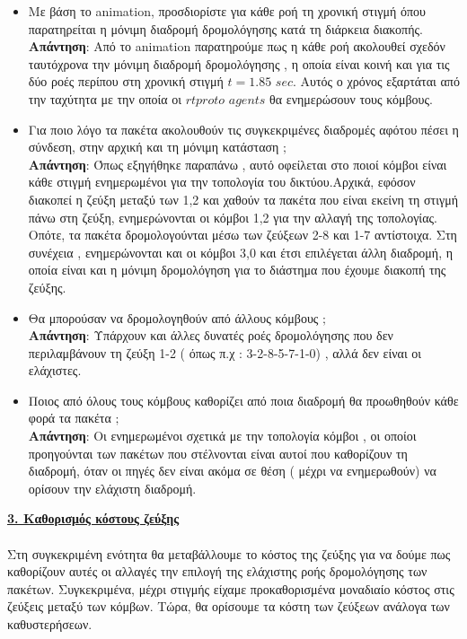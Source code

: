 \documentclass{article}%
\begin{document}
\begin{itemize}
\begin{figure}[htbp]
\begin{minipage}{0.35\textwidth}
\end{minipage}
\end{figure}
	\item Με βάση το \textlatin{animation}, προσδιορίστε για κάθε ροή τη χρονική στιγμή όπου παρατηρείται
η μόνιμη διαδρομή δρομολόγησης κατά τη διάρκεια διακοπής.\\
	\textbf{Απάντηση}: Από το \textlatin{animation} παρατηρούμε πως η κάθε ροή ακολουθεί σχεδόν ταυτόχρονα την μόνιμη διαδρομή δρομολόγησης , η οποία είναι κοινή και για τις δύο ροές περίπου στη χρονική στιγμή $t=1.85$ $sec$. Αυτός ο χρόνος εξαρτάται από την ταχύτητα με την οποία οι $rtproto$ $agents$ θα ενημερώσουν τους κόμβους.
	\item Για ποιο λόγο τα πακέτα ακολουθούν τις συγκεκριμένες διαδρομές αφότου πέσει η
σύνδεση, στην αρχική και τη μόνιμη κατάσταση $;$ \\
	\textbf{Απάντηση}: Όπως εξηγήθηκε παραπάνω , αυτό οφείλεται στο ποιοί κόμβοι είναι κάθε στιγμή ενημερωμένοι για την τοπολογία του δικτύου.Αρχικά, εφόσον διακοπεί η ζεύξη μεταξύ των 1,2 και χαθούν τα πακέτα που είναι εκείνη τη στιγμή πάνω στη ζεύξη, ενημερώνονται οι κόμβοι 1,2 για την αλλαγή της τοπολογίας. Οπότε, τα πακέτα δρομολογούνται μέσω των ζεύξεων 2-8 και 1-7 αντίστοιχα. Στη συνέχεια , ενημερώνονται και οι κόμβοι 3,0 και έτσι επιλέγεται άλλη διαδρομή, η οποία είναι και η μόνιμη δρομολόγηση για το διάστημα που έχουμε διακοπή της ζεύξης.
	\item Θα μπορούσαν να δρομολογηθούν από άλλους κόμβους $;$\\
	\textbf{Απάντηση}: Υπάρχουν και άλλες δυνατές ροές δρομολόγησης που δεν περιλαμβάνουν τη ζεύξη 1-2 ( όπως π.χ : 3-2-8-5-7-1-0) , αλλά δεν είναι οι ελάχιστες.
	\item Ποιος από όλους τους κόμβους καθορίζει από ποια διαδρομή θα προωθηθούν κάθε φορά
τα πακέτα $; $\\ 
	\textbf{Απάντηση}: Οι ενημερωμένοι σχετικά με την τοπολογία κόμβοι , οι οποίοι προηγούνται των πακέτων που στέλνονται είναι αυτοί που καθορίζουν τη διαδρομή, όταν οι πηγές δεν είναι ακόμα σε θέση ( μέχρι να ενημερωθούν) να ορίσουν την ελάχιστη διαδρομή.
	
	
\end{itemize}

\textbf{{\underline{3. Καθορισμός κόστους ζεύξης}}} \\\\
Στη συγκεκριμένη ενότητα θα μεταβάλλουμε το κόστος της ζεύξης για να δούμε πως καθορίζουν αυτές οι αλλαγές την επιλογή της ελάχιστης ροής δρομολόγησης των πακέτων. Συγκεκριμένα, μέχρι στιγμής είχαμε προκαθορισμένα μοναδιαίο κόστος στις ζεύξεις μεταξύ των κόμβων. Τώρα, θα ορίσουμε τα κόστη των ζεύξεων ανάλογα των καθυστερήσεων.\\\\
\end{document}
